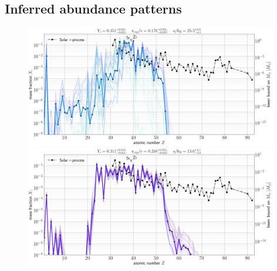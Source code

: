 \documentclass[twocolumn, twocolappendix]{aastex63}
\begin{document}
\subsection{Inferred abundance patterns}\label{ssc:bestfit-abunds}

\begin{figure}[!ht]
    \includegraphics[width=0.98\textwidth]{figs/W18_massfracs_1.40d_Z1-92_Ye_0.351_p0.025_m0.025__vexp_0.176_p0.091_m0.099__s_25.3_p6.0_m4.5__solarL09B14__totalmass1.18e+01M_earth.png}
    \includegraphics[width=0.98\textwidth]{figs/W18_massfracs_1.40d_Z1-92_Ye_0.311_p0.013_m0.011__vexp_0.240_p0.055_m0.082__s_13.6_p4.1_m3.0__solarL09B14__totalmass1.33e+01M_earth.png}

\end{figure}
\end{document}
